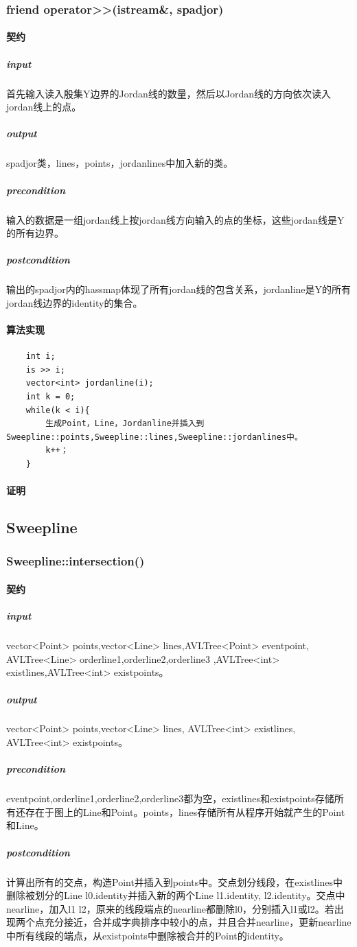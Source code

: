 \documentclass[a4paper]{book}
\numberwithin{equation}{chapter}
\theoremstyle{definition}
\begin{document}
\subsubsection{friend operator>>(istream\&, spadjor)}
\paragraph{契约}
\subparagraph{input}
首先输入读入殷集Y边界的Jordan线的数量，然后以Jordan线的方向依次读入jordan线上的点。
\subparagraph{output}
spadjor类，lines，points，jordanlines中加入新的类。
\subparagraph{precondition}
输入的数据是一组jordan线上按jordan线方向输入的点的坐标，这些jordan线是Y的所有边界。
\subparagraph{postcondition}
输出的spadjor内的hassmap体现了所有jordan线的包含关系，jordanline是Y的所有jordan线边界的identity的集合。
\paragraph{算法实现}
\begin{lstlisting}
	int i;
	is >> i;
	vector<int> jordanline(i);
	int k = 0;
	while(k < i){
		生成Point，Line，Jordanline并插入到Sweepline::points,Sweepline::lines,Sweepline::jordanlines中。
		k++；
	}
\end{lstlisting}
\paragraph{证明}

\subsection{Sweepline}
\subsubsection{Sweepline::intersection()}
\paragraph{契约}
\subparagraph{input}
vector<Point> points,vector<Line> lines,AVLTree<Point> eventpoint, AVLTree<Line> orderline1,orderline2,orderline3 ,AVLTree<int> existlines,AVLTree<int> existpoints。
\subparagraph{output}
vector<Point> points,vector<Line> lines, AVLTree<int> existlines, AVLTree<int> existpoints。
\subparagraph{precondition}
eventpoint,orderline1,orderline2,orderline3都为空，existlines和existpoints存储所有还存在于图上的Line和Point。points，lines存储所有从程序开始就产生的Point和Line。
\subparagraph{postcondition}
计算出所有的交点，构造Point并插入到points中。交点划分线段，在existlines中删除被划分的Line l0.identity并插入新的两个Line l1.identity, l2.identity。交点中nearline，加入l1 l2，原来的线段端点的nearline都删除l0，分别插入l1或l2。若出现两个点充分接近，合并成字典排序中较小的点，并且合并nearline，更新nearline中所有线段的端点，从existpoints中删除被合并的Point的identity。
\end{document}
